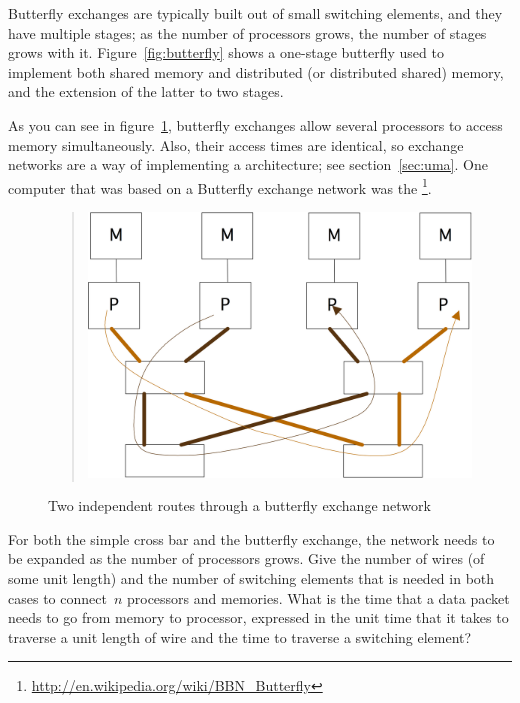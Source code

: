 Butterfly exchanges are typically built out of small switching
elements, and they have multiple stages; as the number of processors
grows, the number of stages grows with it. Figure~\ref{fig:butterfly}
shows a one-stage butterfly used to implement both shared memory and
distributed (or distributed shared) memory, and the extension of the
latter to two stages.

As you can see in figure~\ref{fig:butterflyroute}, butterfly exchanges
allow several processors to access memory simultaneously. Also, their
access times are identical, so exchange networks are a way of
implementing a  architecture; see
section~\ref{sec:uma}. One computer that was based on a Butterfly
exchange network was the
\footnote{\url{http://en.wikipedia.org/wiki/BBN_Butterfly}}.

\begin{figure}[ht]
  \begin{quote}
  \includegraphics[scale=.1]{graphics/butterfly3}
  \end{quote}
  \caption{Two independent routes through a butterfly exchange network}
  \label{fig:butterflyroute}
\end{figure}

\begin{exercise}
For both the simple cross bar and the butterfly
exchange, the network needs to be expanded as the number of processors grows. 
Give the number of wires (of some unit length) and the number of switching
elements that is needed in both cases to connect~$n$ processors and memories. 
What is the time that a data packet needs to go from memory to processor,
expressed in the unit time that it takes to traverse a unit length of wire
and the time to traverse a switching element?
\end{exercise}

